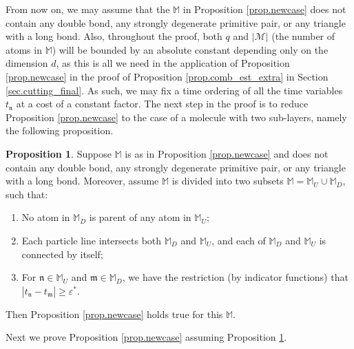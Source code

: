 \documentclass[10pt, reqno]{amsart}
\newcommand{\Mb}{\mathbb M}
\renewcommand{\Mc}{\mathcal M}
\newcommand{\mf}{\mathfrak m}
\newcommand{\nf}{\mathfrak n}
\theoremstyle{definition}
\newtheorem{proposition}[theorem]{Proposition}
\theoremstyle{remark}
\numberwithin{equation}{section}
\begin{document}
From now on, we may assume that the $\Mb$ in Proposition \ref{prop.newcase} does not contain any double bond, any strongly degenerate primitive pair, or any triangle with a long bond. Also, throughout the proof, both $q$ and $|\Mc|$ (the number of atoms in $\Mb$) will be bounded by an absolute constant depending only on the dimension $d$, as this is all we need in the application of Proposition \ref{prop.newcase} in the proof of Proposition \ref{prop.comb_est_extra} in Section \ref{sec.cutting_final}. As such, we may fix a time ordering of all the time variables $t_\nf$ at a cost of a constant factor. The next step in the proof is to reduce Proposition \ref{prop.newcase} to the case of a molecule with two sub-layers, namely the following proposition.
\begin{proposition}
\label{prop.new2layer} Suppose $\Mb$ is as in Proposition \ref{prop.newcase} and does not contain any double bond, any strongly degenerate primitive pair, or any triangle with a long bond. Moreover, assume $\Mb$ is divided into two subsets $\Mb=\Mb_U\cup\Mb_D$, such that:
\begin{enumerate}
\item No atom in $\Mb_D$ is parent of any atom in $\Mb_U$;
\item Each particle line intersects both $\Mb_D$ and $\Mb_U$, and each of $\Mb_D$ and $\Mb_U$ is connected by itself;
\item For $\nf\in\Mb_U$ and $\mf\in\Mb_D$, we have the restriction (by indicator functions) that $|t_{\nf}-t_{\mf}|\geq\varepsilon^*$.
\end{enumerate} Then Proposition \ref{prop.newcase} holds true for this $\Mb$.
\end{proposition}
Next we prove Proposition \ref{prop.newcase} assuming Proposition \ref{prop.new2layer}.
\end{document}
